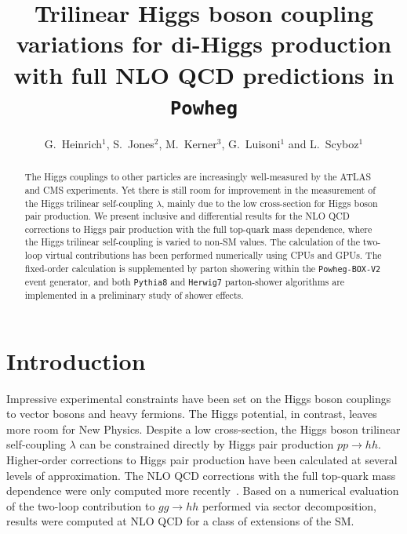 \documentclass[a4paper]{jpconf}
\begin{document}
\title{Trilinear Higgs boson coupling variations for di-Higgs production with full NLO QCD predictions in \texttt{Powheg}}

\author{G.~Heinrich$^1$, S.~Jones$^2$, M.~Kerner$^3$, G.~Luisoni$^1$ and L.~Scyboz$^1$}

\address{$^1$ Max-Planck-Institut f\"ur Physik (Werner-Heisenberg-Institut), F\"ohringer Ring 6, 80805 M\"unchen, Germany}
\address{$^2$ Theoretical Physics Department, CERN, Geneva, Switzerland}
\address{$^3$ Physik-Institut, Universit\"at Z\"urich, Winterthurerstrasse 190, 8057 Z\"urich, Switzerland}


\begin{abstract}
The Higgs couplings to other particles are increasingly well-measured by the ATLAS and CMS experiments. Yet there is still room for improvement in the measurement of the Higgs trilinear self-coupling $\lambda$, mainly due to the low cross-section for Higgs boson pair production. We present inclusive and differential results for the NLO QCD corrections to Higgs pair production with the full top-quark mass dependence, where the Higgs trilinear self-coupling is varied to non-SM values. The calculation of the two-loop virtual contributions has been performed numerically using CPUs and GPUs. The fixed-order calculation is supplemented by parton showering within the \texttt{Powheg-BOX-V2} event generator, and both \texttt{Pythia8} and \texttt{Herwig7} parton-shower algorithms are implemented in a preliminary study of shower effects.
\end{abstract}


\section{Introduction}

Impressive experimental constraints have been set on the Higgs boson couplings to vector bosons and heavy fermions. The Higgs potential, in contrast, leaves more room for New Physics. Despite a low cross-section, the Higgs boson trilinear self-coupling $\lambda$ can be constrained directly by Higgs pair production $pp \to hh$.
Higher-order corrections to Higgs pair production have been calculated at several levels of approximation. The NLO QCD corrections with the full top-quark mass dependence were only computed more recently~\cite{Borowka:2016ehy,Borowka:2016ypz,Baglio:2018lrj}. Based on a numerical evaluation of the two-loop contribution to $gg \to hh$ performed via sector decomposition, results were computed at NLO QCD for a class of extensions of the SM. 
\end{document}
